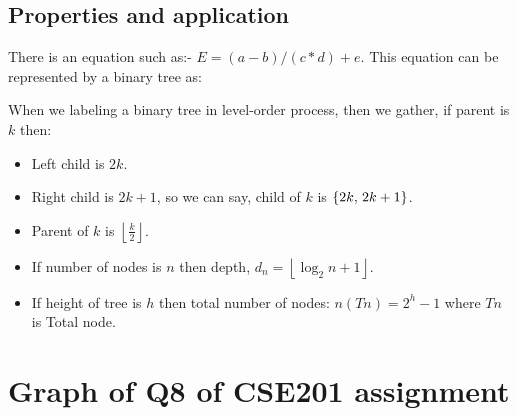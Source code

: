 \documentclass[10 pt]{article}
\begin{document}
\subsection{Properties and application}
There is an equation such as:- $E = (a-b) / (c * d) + e$. This equation can be represented by a binary tree as:\\
\begin{center}
\end{center}

When we labeling a binary tree in level-order process, then we gather, if parent is $k$ then:
\begin{itemize}
	\item Left child is $2k$.
	\item Right child is $2k+1$, so we can say, child of $k$ is $\{2k,\hspace{0.5mm}2k+1\}$.
	\item Parent of $k$ is $\left\lfloor\frac{k}{2}\right\rfloor$.
	\item If number of nodes is $n$ then depth, $d_n = \left\lfloor\log_2n+1\right\rfloor$.
	\item If height of tree is $h$ then total number of nodes: $n(Tn) = 2^h-1$ where $Tn$ is Total node.
\end{itemize}

\pagebreak

\section{Graph of Q8 of CSE201 assignment}
\end{document}
